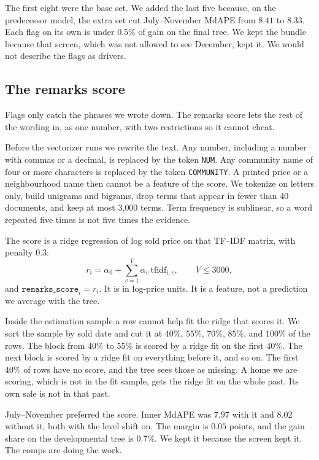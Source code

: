 \documentclass[11pt]{article}
\begin{document}
The first eight were the base set. We added the last five because, on the predecessor model, the extra set cut July--November MdAPE from \(8.41\) to \(8.33\). Each flag on its own is under \(0.5\%\) of gain on the final tree. We kept the bundle because that screen, which was not allowed to see December, kept it. We would not describe the flags as drivers.

\subsection{The remarks score}

Flags only catch the phrases we wrote down. The remarks score lets the rest of the wording in, as one number, with two restrictions so it cannot cheat.

Before the vectorizer runs we rewrite the text. Any number, including a number with commas or a decimal, is replaced by the token \texttt{NUM}. Any community name of four or more characters is replaced by the token \texttt{COMMUNITY}. A printed price or a neighbourhood name then cannot be a feature of the score. We tokenize on letters only, build unigrams and bigrams, drop terms that appear in fewer than 40 documents, and keep at most 3{,}000 terms. Term frequency is sublinear, so a word repeated five times is not five times the evidence.

The score is a ridge regression of log sold price on that TF--IDF matrix, with penalty \(0.3\):
\[
r_i = \alpha_0 + \sum_{v=1}^{V} \alpha_v \,\mathrm{tfidf}_{i,v}, \qquad V \le 3000,
\]
and \(\texttt{remarks\_score}_i = r_i\). It is in log-price units. It is a feature, not a prediction we average with the tree.

Inside the estimation sample a row cannot help fit the ridge that scores it. We sort the sample by sold date and cut it at \(40\%\), \(55\%\), \(70\%\), \(85\%\), and \(100\%\) of the rows. The block from \(40\%\) to \(55\%\) is scored by a ridge fit on the first \(40\%\). The next block is scored by a ridge fit on everything before it, and so on. The first \(40\%\) of rows have no score, and the tree sees those as missing. A home we are scoring, which is not in the fit sample, gets the ridge fit on the whole past. Its own sale is not in that past.

July--November preferred the score. Inner MdAPE was \(7.97\) with it and \(8.02\) without it, both with the level shift on. The margin is \(0.05\) points, and the gain share on the developmental tree is \(0.7\%\). We kept it because the screen kept it. The comps are doing the work.
\end{document}

